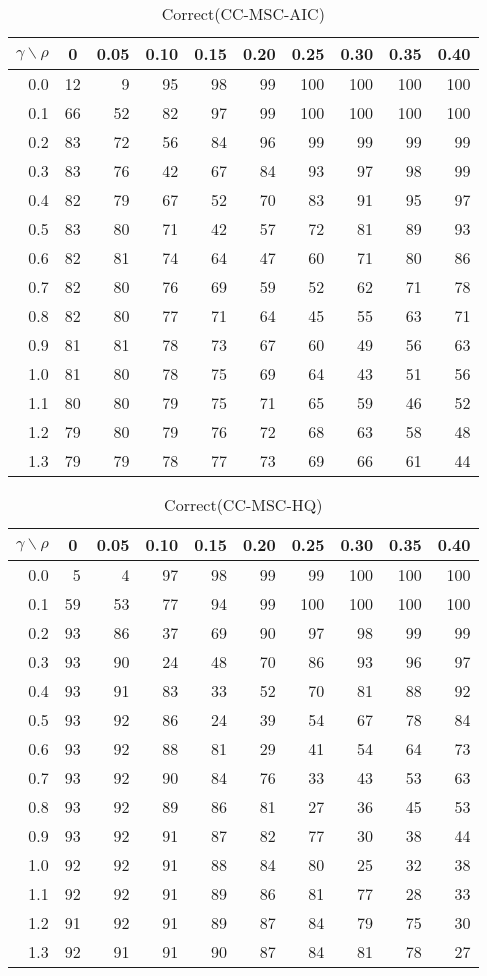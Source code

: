 \documentclass[12pt]{article}
\begin{document}
\begin{table}[!tbp]
\caption{Correct(CC-MSC-AIC)}
 \begin{center}
 \begin{tabular}{r|rrrrrrrrr}\hline\hline
\multicolumn{1}{c|}{$\gamma\backslash\rho$}&\multicolumn{1}{c}{0}&\multicolumn{1}{c}{0.05}&\multicolumn{1}{c}{0.10}&\multicolumn{1}{c}{0.15}&\multicolumn{1}{c}{0.20}&\multicolumn{1}{c}{0.25}&\multicolumn{1}{c}{0.30}&\multicolumn{1}{c}{0.35}&\multicolumn{1}{c}{0.40}\tabularnewline
\hline




0.0&12& 9&95&98&99&100&100&100&100\tabularnewline
0.1&66&52&82&97&99&100&100&100&100\tabularnewline
0.2&83&72&56&84&96& 99& 99& 99& 99\tabularnewline
0.3&83&76&42&67&84& 93& 97& 98& 99\tabularnewline
0.4&82&79&67&52&70& 83& 91& 95& 97\tabularnewline
0.5&83&80&71&42&57& 72& 81& 89& 93\tabularnewline
0.6&82&81&74&64&47& 60& 71& 80& 86\tabularnewline
0.7&82&80&76&69&59& 52& 62& 71& 78\tabularnewline
0.8&82&80&77&71&64& 45& 55& 63& 71\tabularnewline
0.9&81&81&78&73&67& 60& 49& 56& 63\tabularnewline
1.0&81&80&78&75&69& 64& 43& 51& 56\tabularnewline
1.1&80&80&79&75&71& 65& 59& 46& 52\tabularnewline
1.2&79&80&79&76&72& 68& 63& 58& 48\tabularnewline
1.3&79&79&78&77&73& 69& 66& 61& 44\tabularnewline
\hline
\end{tabular}

\end{center}

\end{table}

%


\begin{table}[!tbp]
\caption{Correct(CC-MSC-HQ)}
 \begin{center}
 \begin{tabular}{r|rrrrrrrrr}\hline\hline
\multicolumn{1}{c|}{$\gamma\backslash\rho$}&\multicolumn{1}{c}{0}&\multicolumn{1}{c}{0.05}&\multicolumn{1}{c}{0.10}&\multicolumn{1}{c}{0.15}&\multicolumn{1}{c}{0.20}&\multicolumn{1}{c}{0.25}&\multicolumn{1}{c}{0.30}&\multicolumn{1}{c}{0.35}&\multicolumn{1}{c}{0.40}\tabularnewline
\hline




0.0& 5& 4&97&98&99& 99&100&100&100\tabularnewline
0.1&59&53&77&94&99&100&100&100&100\tabularnewline
0.2&93&86&37&69&90& 97& 98& 99& 99\tabularnewline
0.3&93&90&24&48&70& 86& 93& 96& 97\tabularnewline
0.4&93&91&83&33&52& 70& 81& 88& 92\tabularnewline
0.5&93&92&86&24&39& 54& 67& 78& 84\tabularnewline
0.6&93&92&88&81&29& 41& 54& 64& 73\tabularnewline
0.7&93&92&90&84&76& 33& 43& 53& 63\tabularnewline
0.8&93&92&89&86&81& 27& 36& 45& 53\tabularnewline
0.9&93&92&91&87&82& 77& 30& 38& 44\tabularnewline
1.0&92&92&91&88&84& 80& 25& 32& 38\tabularnewline
1.1&92&92&91&89&86& 81& 77& 28& 33\tabularnewline
1.2&91&92&91&89&87& 84& 79& 75& 30\tabularnewline
1.3&92&91&91&90&87& 84& 81& 78& 27\tabularnewline
\hline
\end{tabular}

\end{center}

\end{table}
\end{document}
